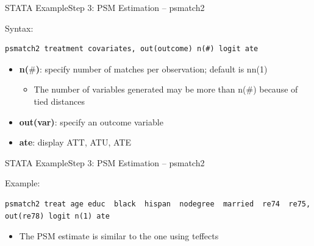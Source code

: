 \documentclass[hyperref={pdfpagelabels=false}]{beamer}
\begin{document}
\begin{frame}[fragile]{STATA Example}{Step 3: PSM Estimation -- psmatch2}
	\item Syntax:
\begin{lstlisting}
psmatch2 treatment covariates, out(outcome) n(#) logit ate
\end{lstlisting}
	\begin{itemize}
		\vspace{0.2cm}
		\item \textbf{n($\#$)}: specify number of matches per observation; default is nn(1)
		\vspace{0.2cm}
			\begin{itemize}
		\item The number of variables generated may be more than n($\#$) because of tied distances
			\end{itemize}
		\vspace{0.2cm}
		\item \textbf{out(var)}: specify an outcome variable
		\vspace{0.2cm}
		\item \textbf{ate}: display ATT, ATU, ATE
		
	\end{itemize}
\end{frame}






\begin{frame}[fragile]{STATA Example}{Step 3: PSM Estimation -- psmatch2}
	\item Example:
\begin{lstlisting}
psmatch2 treat age educ  black  hispan  nodegree  married  re74  re75, out(re78) logit n(1) ate
\end{lstlisting}
	\begin{itemize}
		\vspace{0.2cm}
		\item The PSM estimate is similar to the one using teffects
	\end{itemize}
\end{frame}
\end{document}
